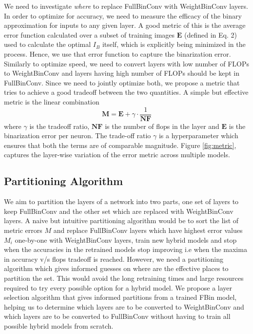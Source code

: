 \noindent We need to investigate {\it where} to replace FullBinConv with WeightBinConv layers. In order to optimize for accuracy, we need to measure the efficacy of the binary approximation for inputs to any given layer. A good metric of this is the average error function calculated over a subset of training images $\mathbf{E}$ (defined in Eq. 2) used to calculate the optimal $I_B$ itself, which is explicitly being minimized in the process. Hence, we use that error function to capture the binarization error.\\

\noindent Similarly to optimize speed, we need to convert layers with low number of FLOPs to WeightBinConv and layers having high number of FLOPs should be kept in FullBinConv. Since we need to jointly optimize both, we propose a metric that tries to achieve a good tradeoff between the two quantities. A simple but effective metric is the linear combination \begin{equation} \mathbf{M} = \mathbf{E} + \gamma \cdot \frac{1}{\mathbf{NF}} \end{equation} where $\gamma$ is the tradeoff ratio, $\mathbf{NF}$ is the number of flops in the layer and $\mathbf{E}$ is the binarization error per neuron. The trade-off ratio $\gamma$ is a hyperparameter which ensures that both the terms are of comparable magnitude. Figure \ref{fig:metric}, captures the layer-wise variation of the error metric across multiple models.

\subsection{Partitioning Algorithm}

\noindent We aim to partition the layers of a network into two parts, one set of layers to keep FullBinConv and the other set which are replaced with WeightBinConv layers. A naive but intuitive partitioning algorithm would be to sort the list of metric errors {\bf $M$} and replace FullBinConv layers which have highest error values {\bf $M_i$} one-by-one with WeightBinConv layers, train new hybrid models and stop when the accuracies in the retrained models stop improving i.e when the maxima in accuracy v/s flops tradeoff is reached. However, we need a partitioning algorithm which gives informed guesses on where are the effective places to partition the set. This would avoid the long retraining times and large resources required to try every possible option for a hybrid model. We propose a layer selection algorithm that gives informed partitions from a trained FBin model, helping us to determine which layers are to be converted to WeightBinConv and which layers are to be converted to FullBinConv without having to train all possible hybrid models from scratch.\\

